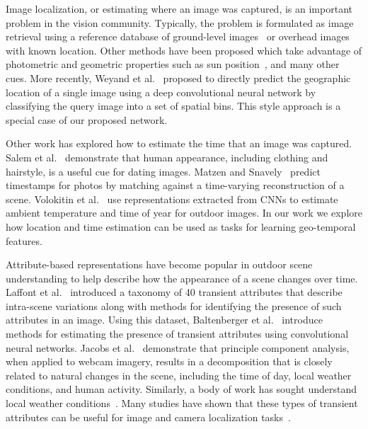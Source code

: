 Image localization, or estimating where an image was captured, is an
important problem in the vision community. Typically, the problem is
formulated as image retrieval using a reference database of
ground-level images~\cite{im2gps} or overhead
images~\cite{lin2015learning,workman2015geocnn,workman2015localize}
with known location.  Other methods have been proposed which take
advantage of photometric and geometric properties such as sun
position~\cite{lalonde2010sun,workman2014rainbow}, and many other
cues. More recently, Weyand et al.~\cite{planet} proposed to directly
predict the geographic location of a single image using a deep
convolutional neural network by classifying the query image into a set
of spatial bins. This style approach is a special case of our proposed
network.

Other work has explored how to estimate the time that an image was
captured. Salem et al.~\cite{salem2016dating} demonstrate that human
appearance, including clothing and hairstyle, is a useful cue for
dating images. Matzen and Snavely~\cite{matzen2014scene} predict timestamps for photos by
matching against a time-varying reconstruction of a scene.  Volokitin
et al.~\cite{eth_biwi_01292} use representations extracted from CNNs
to estimate ambient temperature and time of year for outdoor images.
In our work we explore how location and time estimation can be used
as tasks for learning geo-temporal features. 

Attribute-based representations have become popular in outdoor scene
understanding to help describe how the appearance of a scene changes
over time. Laffont et al.~\cite{laffont2014transient} introduced a taxonomy
of 40 transient attributes that describe intra-scene variations along
with methods for identifying the presence of such attributes in an
image. Using this dataset, Baltenberger et
al.~\cite{baltenberger16transient} introduce methods for estimating
the presence of transient attributes using convolutional neural
networks. Jacobs et al.~\cite{jacobs07amos} demonstrate
that principle component analysis, when applied to webcam imagery,
results in a decomposition that is closely related to natural changes
in the scene, including the time of day, local weather conditions, and
human activity. Similarly, a body of work has sought understand local
weather conditions~\cite{islam13webcamweather,lu2014two}. Many studies
have shown that these types of transient attributes can be useful for
image and camera localization
tasks~\cite{jacobs07geolocate,baltenberger16transient}.

